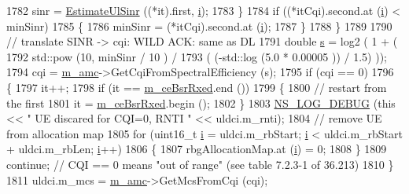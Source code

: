 \begin{DoxyCode}
1782                   sinr = \hyperlink{classns3_1_1TdTbfqFfMacScheduler_a9d1ab86d5693cc316f2c30fff137311e}{EstimateUlSinr} ((*it).first, \hyperlink{bernuolliDistribution_8m_a6f6ccfcf58b31cb6412107d9d5281426}{i});
1783                 \}
1784               \textcolor{keywordflow}{if} ((*itCqi).second.at (\hyperlink{bernuolliDistribution_8m_a6f6ccfcf58b31cb6412107d9d5281426}{i}) < minSinr)
1785                 \{
1786                   minSinr = (*itCqi).second.at (\hyperlink{bernuolliDistribution_8m_a6f6ccfcf58b31cb6412107d9d5281426}{i});
1787                 \}
1788             \}
1789 
1790           \textcolor{comment}{// translate SINR -> cqi: WILD ACK: same as DL}
1791           \textcolor{keywordtype}{double} \hyperlink{generate__test__data__lte__sinr_8m_ad83eeb3a142285d1243a08c6b7026df8}{s} = log2 ( 1 + (
1792                                  std::pow (10, minSinr / 10 )  /
1793                                  ( (-std::log (5.0 * 0.00005 )) / 1.5) ));
1794           cqi = \hyperlink{classns3_1_1TdTbfqFfMacScheduler_a42e469f5ce9e3e079123f5c9a60fe7c4}{m\_amc}->GetCqiFromSpectralEfficiency (s);
1795           \textcolor{keywordflow}{if} (cqi == 0)
1796             \{
1797               it++;
1798               \textcolor{keywordflow}{if} (it == \hyperlink{classns3_1_1TdTbfqFfMacScheduler_ab399ba0c15f9cd1688fb044cf915deb7}{m\_ceBsrRxed}.end ())
1799                 \{
1800                   \textcolor{comment}{// restart from the first}
1801                   it = \hyperlink{classns3_1_1TdTbfqFfMacScheduler_ab399ba0c15f9cd1688fb044cf915deb7}{m\_ceBsrRxed}.begin ();
1802                 \}
1803               \hyperlink{group__logging_ga413f1886406d49f59a6a0a89b77b4d0a}{NS\_LOG\_DEBUG} (\textcolor{keyword}{this} << \textcolor{stringliteral}{" UE discared for CQI=0, RNTI "} << uldci.m\_rnti);
1804               \textcolor{comment}{// remove UE from allocation map}
1805               \textcolor{keywordflow}{for} (uint16\_t \hyperlink{bernuolliDistribution_8m_a6f6ccfcf58b31cb6412107d9d5281426}{i} = uldci.m\_rbStart; \hyperlink{bernuolliDistribution_8m_a6f6ccfcf58b31cb6412107d9d5281426}{i} < uldci.m\_rbStart + uldci.m\_rbLen; 
      \hyperlink{bernuolliDistribution_8m_a6f6ccfcf58b31cb6412107d9d5281426}{i}++)
1806                 \{
1807                   rbgAllocationMap.at (\hyperlink{bernuolliDistribution_8m_a6f6ccfcf58b31cb6412107d9d5281426}{i}) = 0;
1808                 \}
1809               \textcolor{keywordflow}{continue}; \textcolor{comment}{// CQI == 0 means "out of range" (see table 7.2.3-1 of 36.213)}
1810             \}
1811           uldci.m\_mcs = \hyperlink{classns3_1_1TdTbfqFfMacScheduler_a42e469f5ce9e3e079123f5c9a60fe7c4}{m\_amc}->GetMcsFromCqi (cqi);

\end{DoxyCode}
